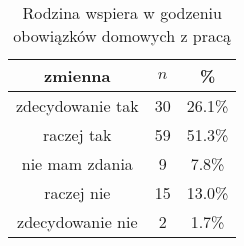 \begin{table}[H]
\caption{Rodzina wspiera w godzeniu obowiązków domowych z pracą}
\centering
\begin{tabular}{ | c | c | c |}
\hline
zmienna & $n$ & \% \\
\hline
zdecydowanie tak  &  30  & 26.1\% \\
\hline
raczej tak  &  59  & 51.3\% \\
\hline
nie mam zdania  &  9  & 7.8\% \\
\hline
raczej nie  &  15  & 13.0\% \\
\hline
zdecydowanie nie  &  2  & 1.7\% \\
\hline
\end{tabular}
\label{tab:Q26}
\end{table}
